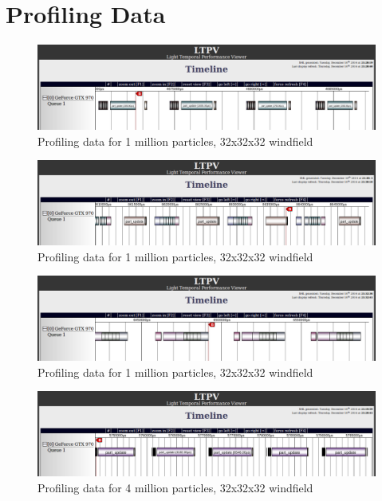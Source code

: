 
\chapter{Profiling Data}
\label{appendix-b}

\begin{figure}[ht!]
\centering
\includegraphics[width=\textwidth]{fig/profiling/1m_32}
\caption{Profiling data for 1 million particles, 32x32x32 windfield}
\label{fig:1m_32}
\end{figure}

\begin{figure}[ht!]
\centering
\includegraphics[width=\textwidth]{fig/profiling/1m_128}
\caption{Profiling data for 1 million particles, 32x32x32 windfield}
\label{fig:1m_128}
\end{figure}

\begin{figure}[ht!]
\centering
\includegraphics[width=\textwidth]{fig/profiling/1m_256}
\caption{Profiling data for 1 million particles, 32x32x32 windfield}
\label{fig:1m_256}
\end{figure}

\begin{figure}[ht!]
\centering
\includegraphics[width=\textwidth]{fig/profiling/4m_32}
\caption{Profiling data for 4 million particles, 32x32x32 windfield}
\label{fig:4m_32}
\end{figure}

